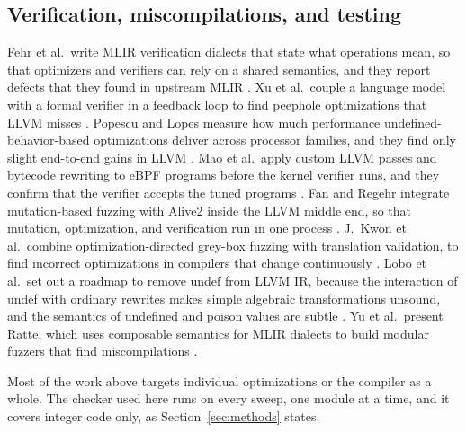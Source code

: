 \subsection{Verification, miscompilations, and testing}

Fehr et al.\ write MLIR verification dialects that state what operations mean, so that optimizers and verifiers can rely on a shared semantics, and they report defects that they found in upstream MLIR \cite{fehr2025first}. Xu et al.\ couple a language model with a formal verifier in a feedback loop to find peephole optimizations that LLVM misses \cite{xu2026lpo}. Popescu and Lopes measure how much performance undefined-behavior-based optimizations deliver across processor families, and they find only slight end-to-end gains in LLVM \cite{popescu2025exploiting}. Mao et al.\ apply custom LLVM passes and bytecode rewriting to eBPF programs before the kernel verifier runs, and they confirm that the verifier accepts the tuned programs \cite{mao2024merlin}. Fan and Regehr integrate mutation-based fuzzing with Alive2 inside the LLVM middle end, so that mutation, optimization, and verification run in one process \cite{fan2024high}. J.\ Kwon et al.\ combine optimization-directed grey-box fuzzing with translation validation, to find incorrect optimizations in compilers that change continuously \cite{kwon2025optimization}. Lobo et al.\ set out a roadmap to remove undef from LLVM IR, because the interaction of undef with ordinary rewrites makes simple algebraic transformations unsound, and the semantics of undefined and poison values are subtle \cite{lee2017undefined,lobo2026towards}. Yu et al.\ present Ratte, which uses composable semantics for MLIR dialects to build modular fuzzers that find miscompilations \cite{yu2025ratte}.

Most of the work above targets individual optimizations or the compiler as a whole. The checker used here runs on every sweep, one module at a time, and it covers integer code only, as Section~\ref{sec:methods} states.
